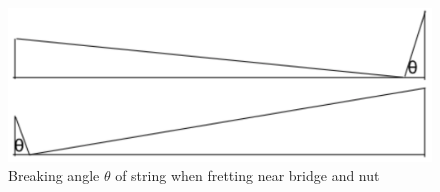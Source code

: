 \documentclass[11pt]{article}
\begin{document}
\begin{flushleft}
                \begin{figure}
                    \includegraphics[width=\textwidth]{breaking_angles.png}
                    \caption{Breaking angle $\theta$ of string when fretting near bridge and nut} \label{fig9}
                \end{figure}
            
    \end{flushleft}
\end{document}
